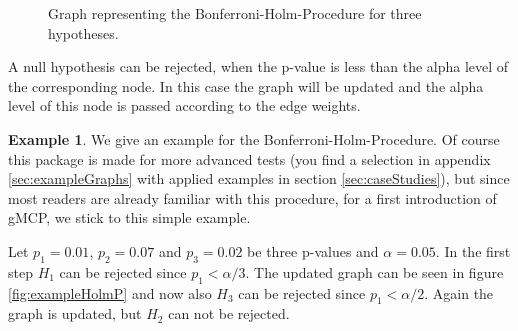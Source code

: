 \documentclass[a4paper, 10pt]{article}\usepackage[]{graphicx}\usepackage[]{color}
\numberwithin{equation}{section}
\theoremstyle{definition}
\newtheorem{Example}[Def]{Example}
\theoremstyle{plain}
\begin{document}
\begin{figure}[ht]
  \centering
{}


  \caption{\label{fig:exampleHolm} Graph representing the
    Bonferroni-Holm-Procedure for three hypotheses.}
\end{figure}

A null hypothesis can be rejected, when the p-value is less than the
alpha level of the corresponding node.  In this case the graph will be
updated and the alpha level of this node is passed according to the
edge weights.

\begin{Example}
  We give an example for the Bonferroni-Holm-Procedure.
  Of course this 
  package is made for more advanced tests (you find a selection in 
  appendix \ref{sec:exampleGraphs} with applied examples in section \ref{sec:caseStudies}),
  but since most readers are already familiar with this procedure,
  for a first introduction of gMCP, we stick to this simple example.  
  
  Let $p_1=0.01$, $p_2=0.07$ and $p_3=0.02$ be three p-values and
  $\alpha=0.05$.  In the first step $H_1$ can be rejected since
  $p_1<\alpha/3$.  The updated graph can be seen in figure
  \ref{fig:exampleHolmP} and now also $H_3$ can be rejected since
  $p_1<\alpha/2$.  Again the graph is updated, but $H_2$
  can not be rejected.
\end{Example}
\end{document}

